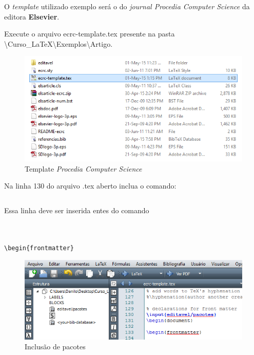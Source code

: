 \begin{frame}
O {\it template} utilizado exemplo será o do {\it journal Procedia Computer Science} da editora \textbf{Elsevier}.

Execute o arquivo {\ttfamily ecrc-template.tex} presente na pasta {\ttfamily\textbackslash Curso\_LaTeX\textbackslash Exemplos\textbackslash Artigo}.
\begin{figure}
\begin{center}
\includegraphics[scale=0.5]{figuras/figelsiever}
\caption{Template \textit{Procedia Computer Science}}
\end{center}
\end{figure}
\end{frame}

\begin{frame}[fragile]
Na linha 130 do arquivo .tex aberto inclua o comando:
\begin{verbatim}

\end{verbatim}

Essa linha deve ser inserida entes do comando

\begin{verbatim}


\begin{frontmatter}
\end{verbatim}

\begin{figure}
\begin{center}
\includegraphics[scale=0.5]{figuras/fig2}
\caption{Inclusão de pacotes}
\end{center}
\end{figure}
\end{frame}



